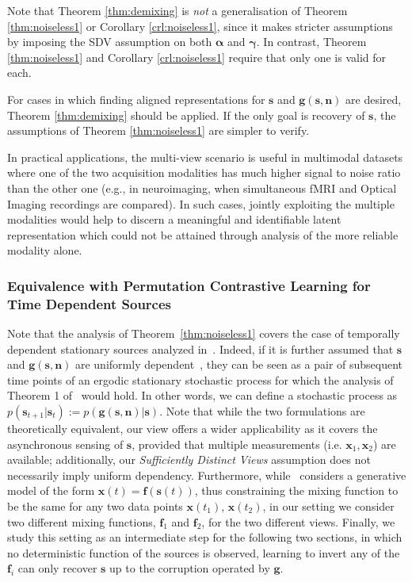 Note that Theorem \ref{thm:demixing} is \emph{not} a generalisation of Theorem \ref{thm:noiseless1} or Corollary \ref{crl:noiseless1}, since it makes stricter assumptions by imposing the SDV assumption on both $\bm{\alpha}$ and $\bm{\gamma}$.
In contrast, Theorem \ref{thm:noiseless1} and Corollary \ref{crl:noiseless1} require that only one is valid for each.

For cases in which finding aligned representations for $\bm{s}$ and $\bm{g}(\bm{s}, \bm{n})$ are desired, Theorem \ref{thm:demixing} should be applied.
If the only goal is recovery of $\bm{s}$, the assumptions of Theorem \ref{thm:noiseless1} are simpler to verify.


In practical applications, the multi-view scenario is useful in multimodal datasets where one of the two acquisition modalities has much higher signal to noise ratio than the other one (e.g., in neuroimaging, when simultaneous fMRI and Optical Imaging recordings are compared). In such cases, jointly exploiting the multiple modalities would help to discern a meaningful and identifiable latent representation which could not be attained through analysis of the more reliable modality alone.


\subsubsection{Equivalence with Permutation Contrastive Learning for Time Dependent Sources}
Note that the analysis of Theorem~\ref{thm:noiseless1} covers the case of temporally dependent stationary sources analyzed in~\cite{pmlr-v54-hyvarinen17a}.
Indeed, if it is further assumed that $\bm{s}$ and $\bm{g}(\bm{s}, \bm{n})$ are uniformly dependent~\cite{pmlr-v54-hyvarinen17a}, they can be seen as a pair of subsequent time points of an ergodic stationary stochastic process for which the analysis of Theorem 1 of~\cite{pmlr-v54-hyvarinen17a} would hold. In other words, we can define a stochastic process as $p(\bm{s}_{t+1}| \bm{s}_t) := p(\bm{g}(\bm{s}, \bm{n})| \bm{s})$.
Note that while the two formulations are theoretically equivalent, our view offers a wider applicability as it covers the asynchronous sensing of $\bm{s}$, provided that multiple measurements (i.e. $\bm{x}_1, \bm{x}_2$) are available; additionally, our \textit{Sufficiently Distinct Views} assumption does not necessarily imply uniform dependency. Furthermore, while~\cite{pmlr-v54-hyvarinen17a} considers a generative model of the form $\bm{x}(t) = \bm{f}(\bm{s}(t))$, thus constraining the mixing function to be the same for any two data points $\bm{x}(t_1)$, $\bm{x}(t_2)$, in our setting we consider two different mixing functions, $\bm{f}_1$ and $\bm{f}_2$, for the two different views.
Finally, we study this setting as an intermediate step for the following two sections, in which no deterministic function of the sources is observed, learning to invert any of the $\bm{f}_i$ can only recover $\bm{s}$ up to the corruption operated by $\bm{g}$.

